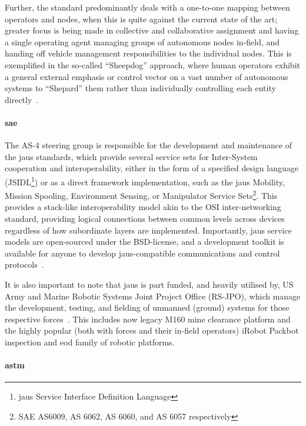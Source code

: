 Further, the standard predominantly deals with a one-to-one mapping between operators and nodes, when this is quite against the current state of the art; greater focus is being made in collective and collaborative assignment and having a single operating agent managing groups of autonomous nodes in-field, and handing off vehicle management responsibilities to the individual nodes.
This is exemplified in the so-called ``Sheepdog'' approach, where human operators exhibit a general external emphasis or control vector on a vast number of autonomous systems to ``Shepard'' them rather than individually controlling each entity directly~\cite{Strombom2014}.

\paragraph{\gls{sae}}

The AS-4 steering group is responsible for the development and maintenance of the \gls{jaus} standards, which provide several service sets for Inter-System cooperation and interoperability, either in the form of a specified design language (JSIDL\footnote{\gls{jaus} Service Interface Definition Language}) or as a direct framework implementation, such as the \gls{jaus} Mobility, Mission Spooling, Environment Sensing, or Manipulator Service Sets\footnote{SAE AS6009, AS 6062, AS 6060, and AS 6057 respectively}.
This provides a stack-like interoperability model akin to the OSI inter-networking standard, providing logical connections between common levels across devices regardless of how subordinate layers are implemented.
Importantly, \gls{jaus} service models are open-sourced under the BSD-license, and a development toolkit is available for anyone to develop \gls{jaus}-compatible communications and control protocols~\cite{JTS}.

It is also important to note that \gls{jaus} is part funded, and heavily utilised by, US Army and Marine Robotic Systems Joint Project Office (RS-JPO), which manage the development, testing, and fielding of unmanned (ground) systems for those respective forces~\cite{JTS,Huang2004}.
This includes now legacy M160 mine clearance platform and the highly popular (both with forces and their in-field operators) iRobot Packbot inspection and \gls{eod} family of robotic platforms.

\paragraph{\gls{astm}}

